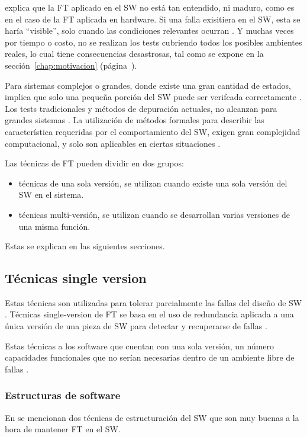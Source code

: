 \cite{FTDesign} explica que la \ac{FT} aplicado en el \ac{SW} no está tan entendido, ni maduro, 
como es en el caso de la \ac{FT} aplicada en hardware. Si una falla exisitiera en el \ac{SW}, esta 
se haría ``visible'', solo cuando las condiciones relevantes ocurran \citep{FTDesign}. Y muchas 
veces por tiempo o costo, no se realizan los tests cubriendo todos los posibles ambientes reales, 
lo cual tiene consecuencias desastrosas, tal como se expone en la sección~\ref{chap:motivacion} 
(página~\pageref{chap:motivacion}).

Para sistemas complejos o grandes, donde existe una gran cantidad de estados, implica que solo una 
pequeña porción del \ac{SW} puede ser verifcada correctamente \citep{FTDesign}. Los tests 
tradicionales y métodos de depuración actuales, no alcanzan para grandes sistemas \citep{FTDesign}. 
La utilización de métodos formales para describir las característica requeridas por el 
comportamiento del \ac{SW}, exigen gran complejidad computacional, y solo son aplicables en 
ciertas situaciones \citep{FTDesign}.

Las técnicas de \ac{FT} pueden dividir en dos grupos:
\begin{itemize}
 \item técnicas de una sola versión, se utilizan cuando existe una sola versión del \ac{SW} en el 
sistema.
 \item técnicas multi-versión, se utilizan cuando se desarrollan varias versiones de una misma 
función. 
\end{itemize}

Estas se explican en las siguientes secciones.

\subsection{Técnicas single version}
Estas técnicas son utilizadas para tolerar parcialmente las fallas del diseño de \ac{SW} 
\citep{Pullum01}. Técnicas single-version de \ac{FT} se basa en el uso de redundancia aplicada a 
una única versión de una pieza de \ac{SW} para detectar y recuperarse de fallas 
\citep{SoftwareFaultToleranceATutorial}. 

Estas técnicas a los software que cuentan con una sola versión, un número capacidades funcionales 
que no serían necesarias dentro de un ambiente libre de fallas \citep{FTDesign}. 

\subsubsection{Estructuras de software}
En \cite{SoftwareFaultToleranceATutorial} se mencionan dos técnicas de estructuración del \ac{SW}
que son muy buenas a la hora de mantener \ac{FT} en el \ac{SW}.

